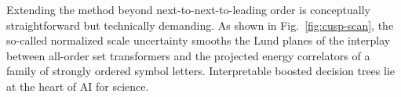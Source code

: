 Extending the method beyond next-to-next-to-leading order is
conceptually straightforward but technically demanding. As shown in
Fig.~\ref{fig:cusp-scan}, the so-called normalized scale uncertainty
smooths the Lund planes of the interplay between all-order set
transformers and the projected energy correlators of a family of
strongly ordered symbol letters. Interpretable boosted decision trees
lie at the heart of AI for science.

